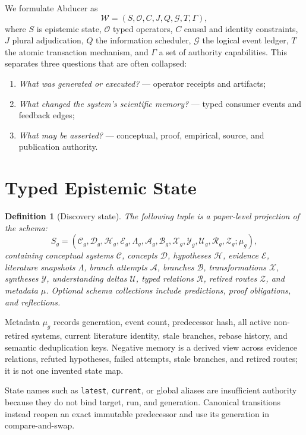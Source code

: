 \documentclass[11pt]{article}
\newtheorem{definition}{Definition}
\begin{document}
We formulate Abducer as
\[
  \mathcal{W}=(S,\mathcal{O},C,J,Q,\mathcal{G},T,\Gamma),
\]
where $S$ is epistemic state, $\mathcal{O}$ typed operators, $C$ causal and identity constraints, $J$ plural adjudication, $Q$ the information scheduler, $\mathcal{G}$ the logical event ledger, $T$ the atomic transaction mechanism, and $\Gamma$ a set of authority capabilities. This separates three questions that are often collapsed:

\begin{enumerate}[leftmargin=*]
  \item \emph{What was generated or executed?} --- operator receipts and artifacts;
  \item \emph{What changed the system's scientific memory?} --- typed consumer events and feedback edges;
  \item \emph{What may be asserted?} --- conceptual, proof, empirical, source, and publication authority.
\end{enumerate}

\section{Typed Epistemic State}

\begin{definition}[Discovery state]
The following tuple is a paper-level projection of the schema:
\[
S_g=(\mathcal{C}_g,\mathcal{D}_g,\mathcal{H}_g,\mathcal{E}_g,
\Lambda_g,\mathcal{A}_g,\mathcal{B}_g,\mathcal{X}_g,
\mathcal{Y}_g,\mathcal{U}_g,\mathcal{R}_g,\mathcal{Z}_g;\mu_g),
\]
containing conceptual systems $\mathcal{C}$, concepts $\mathcal{D}$, hypotheses $\mathcal{H}$, evidence $\mathcal{E}$, literature snapshots $\Lambda$, branch attempts $\mathcal{A}$, branches $\mathcal{B}$, transformations $\mathcal{X}$, syntheses $\mathcal{Y}$, understanding deltas $\mathcal{U}$, typed relations $\mathcal{R}$, retired routes $\mathcal{Z}$, and metadata $\mu$. Optional schema collections include predictions, proof obligations, and reflections.
\end{definition}

Metadata $\mu_g$ records generation, event count, predecessor hash, all active non-retired systems, current literature identity, stale branches, rebase history, and semantic deduplication keys. Negative memory is a derived view across evidence relations, refuted hypotheses, failed attempts, stale branches, and retired routes; it is not one invented state map.

State names such as \texttt{latest}, \texttt{current}, or global aliases are insufficient authority because they do not bind target, run, and generation. Canonical transitions instead reopen an exact immutable predecessor and use its generation in compare-and-swap.
\end{document}
